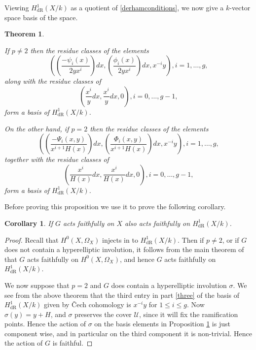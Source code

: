 \documentclass[draft, 11pt]{article} %
\theoremstyle{plain}
\newtheorem{thm}[defn]{Theorem}
\newtheorem{cor}[defn]{Corollary}
\theoremstyle{remark}
\newcommand{\cech}{\v{C}ech }
\newcommand{\derhamhone}{H_{\text {dR}}^1(X/k)}
\begin{document}
Viewing $\derhamhone$ as a quotient of \eqref{derhamconditions}, we now give a $k$-vector space basis of the space.
\begin{thm}\label{basis}

If $p \neq 2$ then the residue classes of the elements 
\begin{equation}\label{one}
 \left( \left( \frac{-\psi_i(x)}{2yx^i}\right) dx, \left(\frac{\phi_i(x)}{2yx^i}\right) dx, x^{-i}y\right), i=1, \ldots ,g,
\end{equation}
along with the residue classes of 
\begin{equation}\label{two}
 \left( \frac{x^{i}}{y} dx , \frac{x^{i}}{y} dx, 0 \right), i = 0,\ldots ,g-1,
\end{equation}
form a basis of $\derhamhone$.

On the other hand, if $p=2$ then the residue classes of the elements 
\begin{equation}\label{three}
\left( \left(\frac{-\Psi_i(x,y)}{x^{i+1}H(x)}\right) dx, \left( \frac{\Phi_i(x,y)}{x^{i+1}H(x)} \right) dx, x^{-i}y \right), i =1, \ldots , g, 
\end{equation}
together with the residue classes of 
\begin{equation}\label{four}
 \left( \frac{x^{i}}{H(x)} dx, \frac{x^{i}}{H(x)} dx, 0 \right), i=0, \ldots, g-1,
\end{equation}
form a basis of $\derhamhone$.

\end{thm}

Before proving this proposition we use it to prove the following corollary.


\begin{cor}

If $G$ acts faithfully on $X$ also acts faithfully on $\derhamhone$.

\end{cor}
\begin{proof}

Recall that $H^0(X,\Omega_X)$ injects in to $\derhamhone$.
Then if $p \neq 2$, or if $G$ does not contain a hyperelliptic involution, it follows from the main theorem of \cite{faithfulaction} that $G$ acts faithfully on $H^0(X,\Omega_X)$, and hence $G$ acts faithfully on $\derhamhone$.

We now suppose that $p=2$ and $G$ does contain a hyperelliptic involution $\sigma$.
We see from the above theorem that the third entry in part \eqref{three} of the basis of $\derhamhone$ given by \cech cohomology is $x^{-i}y$ for $1 \leq i \leq g$.
Now $\sigma(y) = y+ H$, and $\sigma$ preserves the cover $\mathcal U$, since it will fix the ramification points.
Hence the action of $\sigma$ on the basis elements in Proposition \ref{basis} is just component wise, and in particular on the third component it is non-trivial.
Hence the action of $G$ is faithful.

\end{proof}
\end{document}
